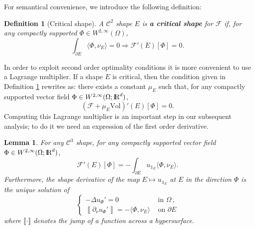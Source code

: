 \documentclass{article}
\newcommand{\R}{\textnormal{I\kern-0.21emR}}
\newtheorem{definition}[material]{Definition}
\newtheorem{lemma}[material]{Lemma}
\def\O{{\Omega}}
\numberwithin{equation}{section}
\begin{document}
For semantical convenience, we introduce the following definition:
\begin{definition}[Critical shape]\label{De:CriticalShape}
A $\mathscr C^2$ shape $E$ is \textbf{ a critical shape } for $\mathscr F$ if, for any compactly supported $\Phi\in W^{2,\infty}(\O)$, 
\[ \int_{\partial E} \langle \Phi,\nu_E\rangle=0\Rightarrow \mathscr F'(E)[\Phi]=0.\]
\end{definition}
In order to exploit second order optimality conditions it is more convenient to use a Lagrange multiplier. If a shape $E$ is critical, then the condition given in Definition \ref{De:CriticalShape} rewrites as: there exists a constant $\mu_E$ such that, for any compactly supported vector field $\Phi\in W^{2,\infty}(\O;\R^d)$, 
\begin{equation}\label{Eq:VolDeriv}\left(\mathscr F+\mu_E\mathrm{Vol}\right)'(E)[\Phi]=0.\end{equation} Computing this Lagrange multiplier is an important step in our subsequent analysis; to do it we need an expression of the first order derivative.
\begin{lemma}\label{Le:FirstSD}
For any $\mathscr C^3$ shape, for any compactly supported vector field $\Phi \in W^{2,\infty}(\O;\R^d)$, 
\[ \mathscr F'(E)[\Phi]=-\int_{\partial E} u_{\mathds 1_E}\langle \Phi,\nu_E\rangle.\] Furthermore, the shape derivative of the map $E\mapsto u_{\mathds 1_E}$ at $E$ in the direction $\Phi$ is the unique solution of 
\begin{equation}\label{Eq:FSDu}
\begin{cases}
-\Delta u_\Phi'=0&\text{ in }\O\,, 
\\ \left\llbracket \partial_\nu u_\Phi' \right\rrbracket=-\langle \Phi,\nu_E\rangle&\text{ on }\partial E
\end{cases}
\end{equation} where $\llbracket\cdot\rrbracket$ denotes the jump of a function across a hypersurface.

\end{lemma} 
\end{document}
